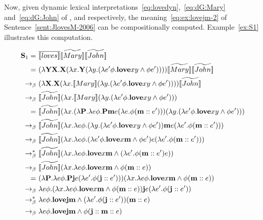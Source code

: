 Now, given dynamic lexical interpretations~\eqref{eq:lovedyn},~\eqref{eq:dG:Mary} and~\eqref{eq:dG:John} of ,  and  respectively, the meaning~\eqref{eq:ex:lovejm-2} of Sentence~\eqref{sent:JlovesM-2006}  can be compositionally computed. Example~\ref{ex:S1} illustrates this computation.

\begin{example}
\begin{align}
\S_1 = \ & \tr{\I{loves}} \etr{\I{Mary}} \etr{\I{John}}  \notag \\
= \ & (\lambda \Y2 \X2. \X2( \lambda \x1. \Y2 (\lambda \y1. ( \lambda e' \phi. \textbf{love} \x1 \y1 \land \phi e' ))) )  \etr{\I{Mary}} \etr{\I{John}}  \notag \\
\bconv \ & (\lambda  \X2. \X2( \lambda \x1. \I{Mary}  (\lambda \y1. ( \lambda e' \phi. \textbf{love} \x1 \y1 \land \phi e' ))) )  \etr{\I{John}}  \notag \\
\bconv \ &   \etr{\I{John}}( \lambda \x1. \I{Mary}  (\lambda \y1. ( \lambda e' \phi. \textbf{love} \x1 \y1 \land \phi e' )))   \notag \\
= \ &   \etr{\I{John}}( \lambda \x1. (\lambda \P2. \lambda e \phi. \P2 \textbf{m} e (\lambda e. \phi (\upii{\textbf{m}}{e'})))  (\lambda \y1. ( \lambda e' \phi. \textbf{love} \x1 \y1 \land \phi e' )))   \notag \\
\bconv \ &    \etr{\I{John}}( \lambda \x1.  \lambda e \phi. (\lambda \y1. ( \lambda e' \phi. \textbf{love} \x1 \y1 \land \phi e' )) \textbf{m} e (\lambda e'. \phi (\upii{\textbf{m}}{e'})))   \notag \\
\bconv \ &   \etr{\I{John}}( \lambda \x1.  \lambda e \phi. ( \lambda e' \phi. \textbf{love} \x1 \textbf{m} \land \phi e' ) e (\lambda e' . \phi (\upii{\textbf{m}}{e'})))   \notag \\
\bred \ & \etr{\I{John}}( \lambda \x1.  \lambda e \phi.  \textbf{love} \x1 \textbf{m} \land  (\lambda e' .\phi (\upii{\textbf{m}}{e'}) e))   \notag \\
\bconv \ &  \etr{\I{John}}( \lambda \x1.  \lambda e \phi.  \textbf{love} \x1 \textbf{m} \land  \phi (\upii{\textbf{m}}{e} ))   \notag \\
= \ &    ( \lambda \P2. \lambda e \phi. \P2 \textbf{j} e (\lambda e' .\phi (\upii{\textbf{j}}{e'})))( \lambda \x1.  \lambda e \phi.  \textbf{love} \x1 \textbf{m} \land  \phi (\upii{\textbf{m}}{e} ))   \notag \\
\bconv \ &    \lambda e \phi. ( \lambda \x1.  \lambda e \phi.  \textbf{love} \x1 \textbf{m} \land  \phi (\upii{\textbf{m}}{e} ))   \textbf{j} e (\lambda e' . \phi (\upii{\textbf{j}}{e'})) \notag \\
\bred \ &    \lambda e \phi.  \textbf{love}  \textbf{j} \textbf{m} \land   (\lambda e' .\phi (\upii{\textbf{j}}{e'})) (\upii{\textbf{m}}{e} )  \notag \\
\bconv \ &    \lambda e \phi.  \textbf{love}  \textbf{j} \textbf{m} \land   \phi (\upii{\textbf{j}}{\upii{\textbf{m}}{e} })  \label{eq:2006:JohnLovesMary} 
\end{align} \label{ex:S1} \qex
\end{example}


